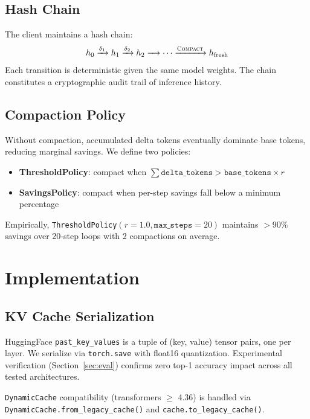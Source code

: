 \documentclass[11pt,a4paper]{article}
\begin{document}
\subsection{Hash Chain}

The client maintains a hash chain:
\[
  h_0 \xrightarrow{\delta_1} h_1 \xrightarrow{\delta_2} h_2
  \xrightarrow{\phantom{xx}} \cdots
  \xrightarrow{\textsc{Compact}} h_\text{fresh}
\]
Each transition is deterministic given the same model weights. The chain
constitutes a cryptographic audit trail of inference history.

\subsection{Compaction Policy}

Without compaction, accumulated delta tokens eventually dominate base tokens,
reducing marginal savings. We define two policies:

\begin{itemize}
  \item \textbf{ThresholdPolicy}: compact when
        $\sum \texttt{delta\_tokens} > \texttt{base\_tokens} \times r$
  \item \textbf{SavingsPolicy}: compact when per-step savings fall below
        a minimum percentage
\end{itemize}

Empirically, \texttt{ThresholdPolicy}$(r{=}1.0, \texttt{max\_steps}{=}20)$
maintains $>$90\% savings over 20-step loops with 2 compactions on average.

\section{Implementation}
\label{sec:impl}

\subsection{KV Cache Serialization}

HuggingFace \texttt{past\_key\_values} is a tuple of (key, value) tensor
pairs, one per layer. We serialize via \texttt{torch.save} with float16
quantization. Experimental verification (Section~\ref{sec:eval}) confirms
zero top-1 accuracy impact across all tested architectures.

\texttt{DynamicCache} compatibility (transformers $\geq$ 4.36) is handled
via \texttt{DynamicCache.from\_legacy\_cache()} and
\texttt{cache.to\_legacy\_cache()}.
\end{document}
